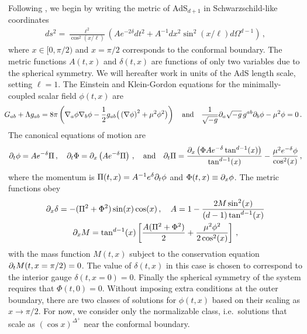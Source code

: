 \documentclass[../PhD.tex]{subfiles}
\begin{document}
Following \cite{1508.02709}, we begin by writing the metric of AdS$_{d+1}$ in Schwarzschild-like coordinates 
\begin{align}
ds^2 = \frac{\ell^2}{\cos^2 \left(x / \ell \right)} \left( A e^{-2\delta} dt^2 + A^{-1}dx^2 \sin^2 \left(x / \ell \right) d\Omega^{d-1} \right) \, ,
\end{align}
where $x \in [0, \pi/2)$ and $x = \pi / 2$ corresponds to the conformal boundary. The metric functions $A(t,x)$ and $\delta(t,x)$ are functions of only two variables due to the spherical symmetry. We will hereafter work in units of the AdS length scale, setting $\ell = 1$. The Einstein and Klein-Gordon equations for the minimally-coupled scalar field $\phi(t,x)$ are
\begin{align}
\!\!\!\! G_{ab} + \Lambda g_{ab} = 8\pi \left( \nabla_a \phi \nabla_b \phi - \frac{1}{2} g_{ab} \big( \left( \nabla \phi \right)^2 + \mu^2 \phi^2 \big) \right) \quad \text{and} \quad \frac{1}{\sqrt{-g}} \partial_a \sqrt{-g} \, g^{ab} \partial_b \phi - \mu^2 \phi = 0 \, .
\end{align}
The canonical equations of motion are \cite{1210.1566}
\begin{align}
\label{canon eqns}
\partial_t \phi = A e^{-\delta} \Pi \, , \quad \partial_t \Phi = \partial_x \left( A e^{-\delta} \Pi \right) \, , \quad \text{and} \quad \partial_t \Pi = \frac{\partial_x \left( \Phi A e^{-\delta} \tan^{d-1} (x) \right)}{\tan^{d-1}(x)} - \frac{\mu^2 e^{-\delta} \phi}{\cos^2 (x)} \, ,
\end{align}
where the momentum is $\Pi(t,x) = A^{-1} e^{\delta} \partial_t \phi$ and $\Phi(t,x) \equiv \partial_x \phi$. The metric functions obey
\begin{align}
\label{metric funcs}
\begin{gathered}
\partial_x \delta = - (\Pi^2 + \Phi^2 ) \sin (x) \cos(x) \, , \quad A = 1 - \frac{2M \sin^2 (x) }{(d-1) \tan^{d-1}(x)} \\
\partial_x M = \tan^{d-1}(x) \left[ \frac{A (\Pi^2 + \Phi^2)}{2} + \frac{\mu^2 \phi^2}{2 \cos^2 (x)} \right] \, ,
\end{gathered}
\end{align}
with the mass function $M(t,x)$ subject to the conservation equation $\partial_t M( t, x = \pi/2) = 0$. The value of $\delta(t,x)$ in this case is chosen to correspond to the interior gauge $\delta(t,x=0) = 0$. Finally the spherical symmetry of the system requires that $\Phi (t, 0) = 0$. Without imposing extra conditions at the outer boundary, there are two classes of solutions for $\phi(t,x)$ based on their scaling as $x \to \pi/2$. For now, we consider only the normalizable class, i.e.~solutions that scale as $(\cos x)^{\Delta^+}$ near the conformal boundary.
\end{document}
